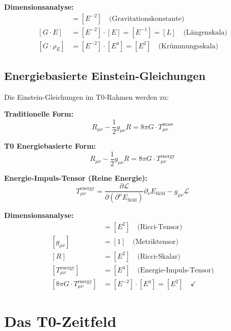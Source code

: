 \documentclass[12pt,a4paper]{report}
\begin{document}
	\textbf{Dimensionsanalyse:}
	\begin{align}
		[G] &= [E^{-2}] \quad \text{(Gravitationskonstante)} \\
		[G \cdot E] &= [E^{-2}] \cdot [E] = [E^{-1}] = [L] \quad \text{(Längenskala)} \\
		[G \cdot \rho_E] &= [E^{-2}] \cdot [E^4] = [E^2] \quad \text{(Krümmungsskala)}
	\end{align}
	
	\subsection{Energiebasierte Einstein-Gleichungen}
	\label{subsec:energy_einstein_equations}
	
	Die Einstein-Gleichungen im T0-Rahmen werden zu:
	
	\textbf{Traditionelle Form:}
	\begin{equation}
		R_{\mu\nu} - \frac{1}{2}g_{\mu\nu}R = 8\pi G \cdot T_{\mu\nu}^{\text{mass}}
	\end{equation}
	
	\textbf{T0 Energiebasierte Form:}
	\begin{equation}
		R_{\mu\nu} - \frac{1}{2}g_{\mu\nu}R = 8\pi G \cdot T_{\mu\nu}^{\text{energy}}
	\end{equation}
	
	\textbf{Energie-Impuls-Tensor (Reine Energie):}
	\begin{equation}
		T_{\mu\nu}^{\text{energy}} = \frac{\partial \mathcal{L}}{\partial (\partial^\mu E_{\text{field}})} \partial_\nu E_{\text{field}} - g_{\mu\nu} \mathcal{L}
	\end{equation}
	
	\textbf{Dimensionsanalyse:}
	\begin{align}
		[R_{\mu\nu}] &= [E^2] \quad \text{(Ricci-Tensor)} \\
		[g_{\mu\nu}] &= [1] \quad \text{(Metriktensor)} \\
		[R] &= [E^2] \quad \text{(Ricci-Skalar)} \\
		[T_{\mu\nu}^{\text{energy}}] &= [E^4] \quad \text{(Energie-Impuls-Tensor)} \\
		[8\pi G \cdot T_{\mu\nu}^{\text{energy}}] &= [E^{-2}] \cdot [E^4] = [E^2] \quad \checkmark
	\end{align}
	
	\section{Das T0-Zeitfeld}
	\label{sec:t0_time_field}
	
\end{document}
